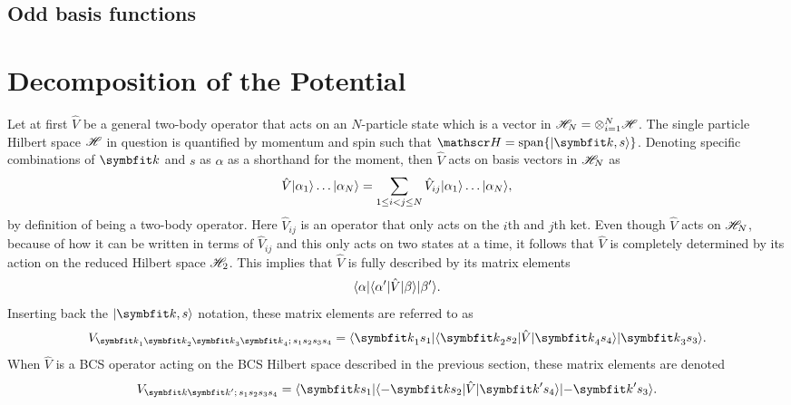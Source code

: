 \subsection{Odd basis functions}

\section{Decomposition of the Potential}

Let at first $\hat{V}$ be a general two-body operator that acts on an $N$-particle state which is a vector in $\mathscr{H}_N = \otimes_{i=1}^N\mathscr{H}$. The
single particle Hilbert space $\mathscr{H}$ in question is quantified by momentum and spin such that $\hil=\Span\{\ket{\v{k},s}\}$. Denoting specific combinations
of $\v{k}$ and $s$ as $\alpha$ as a shorthand for the moment, then $\hat{V}$ acts on basis vectors in $\mathscr{H}_N$ as
\begin{equation}
    \label{eq:Group:Potential:twoBodyInteraction}
    \hat{V}\lvert \alpha_1 \rangle\ldots\lvert \alpha_N \rangle = \sum_{1\leq i<j\leq N}\hat{V}_{ij}\lvert \alpha_1 \rangle\ldots\lvert \alpha_N \rangle,
\end{equation}
by definition of being a two-body operator. Here $\hat{V}_{ij}$ is an operator that only acts on the $i$th and $j$th ket. Even though $\hat{V}$ acts on
$\mathscr{H}_N$, because of how it can be written in terms of $\hat{V}_{ij}$ and this only acts on two states at a time, it follows that $\hat{V}$ is
completely determined by its action on the reduced Hilbert space $\mathscr{H}_2$. This implies that $\hat{V}$ is fully described by its matrix elements
\begin{equation}
    \label{eq:Group:Potential:genTwoBodyMatrixElem}
    \langle \alpha \rvert\langle \alpha' \rvert\hat{V}\lvert \beta \rangle\lvert \beta' \rangle.
\end{equation}
Inserting back the $\ket{\v{k},s}$ notation, these matrix elements are referred to as
\begin{equation}
    \label{eq:Group:Potential:momSpinPotentialMatrixElems}
    V_{\v{k}_1\v{k}_2\v{k}_3\v{k}_4;\,s_1s_2s_3s_4} = \bra{\v{k}_1s_1}\bra{\v{k}_2s_2}\hat{V}\ket{\v{k}_4s_4}\ket{\v{k}_3s_3}.
\end{equation}
When $\hat{V}$ is a BCS operator acting on the BCS Hilbert space described in the previous section, these matrix elements are denoted
\begin{equation}
    \label{eq:Group:Potential:bcsTwoBodyMatrixElem}
    V_{\v{k}\v{k}';\,s_1s_2s_3s_4} = \bra{\v{k}s_1}\bra{-\v{k}s_2}\hat{V}\ket{\v{k}'s_4}\ket{-\v{k}'s_3}.
\end{equation}


